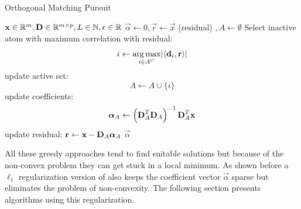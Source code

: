 \begin{algorithm}[h]
\caption{Orthogonal Matching Pursuit}
\label{alg:omp}
\begin{algorithmic}[1]
\REQUIRE $\boldsymbol{\mathrm{x}} \in \mathbb{R}^m, \boldsymbol{\mathrm{D}} \in \mathbb{R}^{m\times p}, L \in
\mathbb{N}, \epsilon \in \mathbb{R}$
\STATE $\vec{\alpha} \gets 0, \vec{r} \gets \vec{x} $ (residual) $, A \gets
\emptyset$
\STATE Select inactive atom with maximum correlation with residual: 
\begin{equation*}
i \gets \operatorname*{arg\,max}_{i \in A^C} \lvert \left<\boldsymbol{\mathrm{d}}_i,\boldsymbol{\mathrm{r}}\right> \rvert
\end{equation*}
\STATE update active set:
\begin{equation*}
 A \gets A \cup \{i\} 
\end{equation*}
\STATE update coefficients: 
\begin{align}
\boldsymbol{\mathrm{\alpha}}_A \gets \left( \boldsymbol{\mathrm{D}}_A^T \boldsymbol{\mathrm{D}}_A \right)^{-1}
\boldsymbol{\mathrm{D}}_A^T\boldsymbol{\mathrm{x}} 
\label{eq:omp_update}
\end{align}\label{alg:OMP_DTD}
\STATE update residual: $\boldsymbol{\mathrm{r}} \gets \boldsymbol{\mathrm{x}}-\boldsymbol{\mathrm{D}}_A\boldsymbol{\mathrm{\alpha}}_A$
\ENDFOR
\RETURN $\vec{\alpha}$
\end{algorithmic}
\end{algorithm}

All these greedy approaches tend to find suitable solutions but
because of the non-convex problem they can get stuck in a local minimum. As
shown before a $\ell_1$ regularization version of  also
keeps the coefficient vector $\vec{\alpha}$ sparse but eliminates the problem of
non-convexity. The following section presents algorithms using this
regularization.


